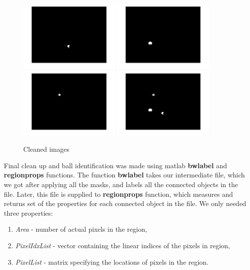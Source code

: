\documentclass[10pt,a4paper,oneclumn]{article}
\begin{document}
\begin{figure}[h!]
\centering
  \includegraphics[width=5cm]{cleanedYell.jpg}
  \includegraphics[width=5cm]{cleanGreen.jpg}
  \includegraphics[width=5cm]{cleanRed.jpg}
  \includegraphics[width=5cm]{cleanAll.jpg}
\caption{Cleaned images}
\end{figure}

Final clean up and ball identification was made using matlab \textbf{bwlabel} and \textbf{regionprops} functions. The function \textbf{bwlabel} takes our intermediate file, which we got after applying all the masks, and labels all the connected objects in the file. Later, this file is supplied to \textbf{regionprops} function, which measures and returns set of the properties for each connected object in the file. We only needed three properties:

\begin{enumerate}
\item \emph{Area} - number of actual pixels in the region,
\item \emph{PixelIdxList} - vector containing the linear indices of the pixels in region,
\item \emph{PixelList} - matrix specifying the locations of pixels in the region.
\end{enumerate}
\end{document}

